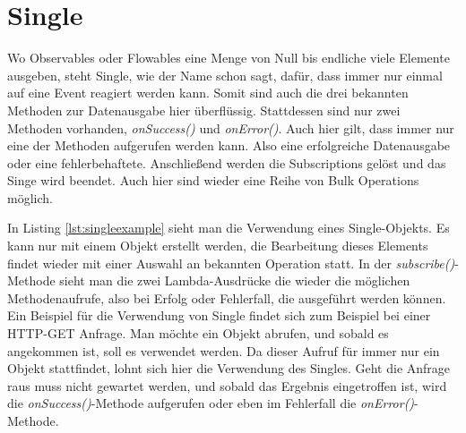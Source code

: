 \section{Single}
Wo Observables oder Flowables eine Menge von Null bis endliche viele Elemente ausgeben, steht Single, wie der Name schon sagt, dafür, dass immer nur einmal auf eine Event reagiert werden kann. Somit sind auch die drei bekannten Methoden zur Datenausgabe hier überflüssig. Stattdessen sind nur zwei Methoden vorhanden, \textit{onSuccess()} und \textit{onError()}. Auch hier gilt, dass immer nur eine der Methoden aufgerufen werden kann. Also eine erfolgreiche Datenausgabe oder eine fehlerbehaftete. Anschließend werden die Subscriptions gelöst und das Singe wird beendet. Auch hier sind wieder eine Reihe von Bulk Operations möglich. 

In Listing \ref{lst:singleexample} sieht man die Verwendung eines Single-Objekts. Es kann nur mit einem Objekt erstellt werden, die Bearbeitung dieses Elements findet wieder mit einer Auswahl an bekannten Operation statt. In der \textit{subscribe()}-Methode sieht man die zwei Lambda-Ausdrücke die wieder die möglichen Methodenaufrufe, also bei Erfolg oder Fehlerfall, die ausgeführt werden können. Ein Beispiel für die Verwendung von Single findet sich zum Beispiel bei einer HTTP-GET Anfrage. Man möchte ein Objekt abrufen, und sobald es angekommen ist, soll es verwendet werden. Da dieser Aufruf für immer nur ein Objekt stattfindet, lohnt sich hier die Verwendung des Singles. Geht die Anfrage raus muss nicht gewartet werden, und sobald das Ergebnis eingetroffen ist, wird die \textit{onSuccess()}-Methode aufgerufen oder eben im Fehlerfall die \textit{onError()}-Methode. 
